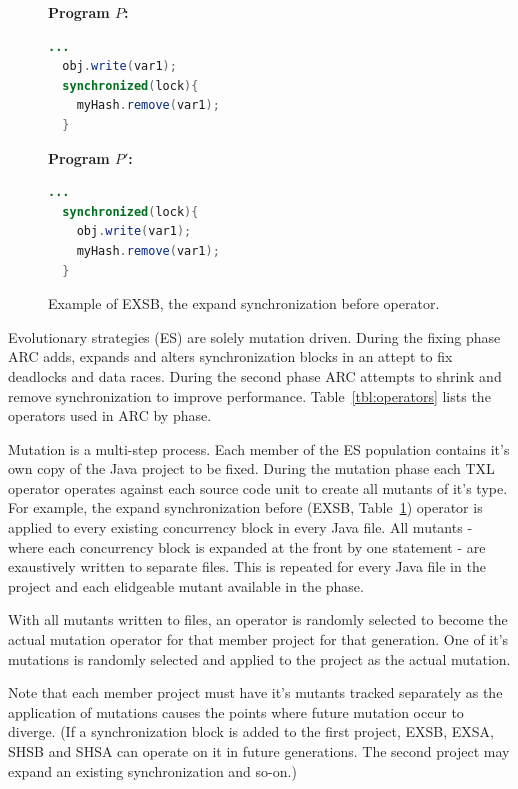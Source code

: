\documentclass[10pt, conference, compsocconf]{IEEEtran}
\begin{document}
\begin{figure}[h!]
\vspace{2mm}
\begin{minipage}{3.70cm}

\footnotesize{\textbf{ Program $P$:}}
\begin{lstlisting}[language=Java]
  ...
  obj.write(var1);
  synchronized(lock){
    myHash.remove(var1);
  }
\end{lstlisting}
\end{minipage}\hfill
\begin{minipage}{3.70cm}
\footnotesize{\textbf{ Program $P'$:}}
\begin{lstlisting}[language=Java]
  ...
  synchronized(lock){
    obj.write(var1);
    myHash.remove(var1);
  }
\end{lstlisting}
\end{minipage}

\caption{Example of EXSB, the expand synchronization before operator.}
\label{fig:EXSBExample}
\end{figure}

Evolutionary strategies (ES) are solely mutation driven. During the fixing
phase ARC adds, expands and alters synchronization blocks in an attept to fix
deadlocks and data races. During the second phase ARC attempts to shrink and
remove synchronization to improve performance. Table~\ref{tbl:operators} lists
the operators used in ARC by phase.

Mutation is a multi-step process. Each member of the ES population contains
it's own copy of the Java project to be fixed.  During the mutation phase each
TXL operator operates against each source code unit to create all mutants of
it's type. For example, the expand synchronization before (EXSB,
Table~\ref{fig:EXSBExample}) operator is applied to every existing concurrency
block in every Java file. All mutants - where each concurrency block is
expanded at the front by one statement - are exaustively written to separate
files. This is repeated for every Java file in the project and each elidgeable
mutant available in the phase.

With all mutants written to files, an operator is randomly selected to become
the actual mutation operator for that member project for that generation.  One
of it's mutations is randomly selected and applied to the project as the actual
mutation.

Note that each member project must have it's mutants tracked separately as the
application of mutations causes the points where future mutation occur to
diverge.  (If a synchronization block is added to the first project, EXSB,
EXSA, SHSB and SHSA can operate on it in future generations. The second project
may expand an existing synchronization and so-on.)
\end{document}
